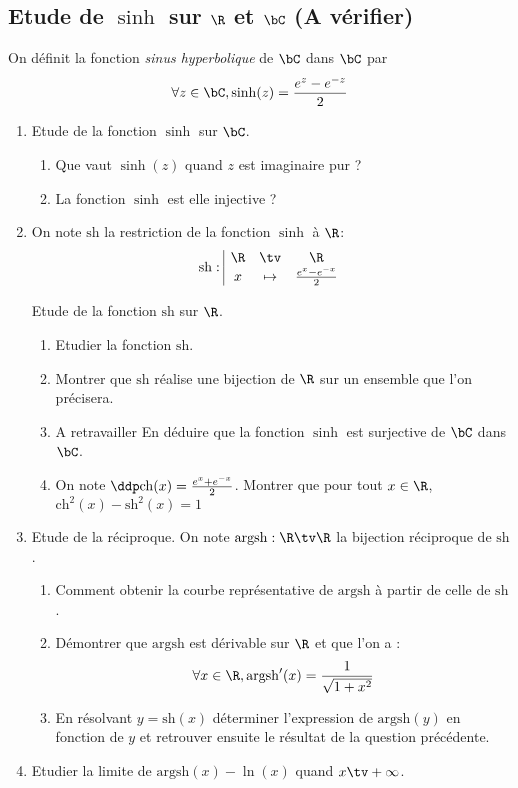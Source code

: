 \subsection{Etude de $\sinh$ sur $\R$ et $\bC$ (A vérifier)} 


\begin{exercice}
On définit la fonction \emph{sinus hyperbolique} de  $\bC$ dans $\bC$ par  
$$\forall z\in \bC, \sinh(z) =\frac{e^z -e^{-z}}{2}$$


\begin{enumerate}
\item Etude de la fonction $\sinh$ sur $\bC$.
\begin{enumerate}
\item Que vaut $\sinh(z)$ quand $z$ est imaginaire pur ? 
\item La fonction $\sinh$ est elle injective ? 
\end{enumerate}

\item  On note $\mathrm{sh}$ la restriction de la fonction $\sinh$ à $\R$:
$$\mathrm{sh} :  \begin{array}{|ccc}
\R &\tv& \R\\
x &\mapsto & \frac{e^x -e^{-x}}{2}
\end{array}$$ 

Etude de la fonction $\mathrm{sh}$ sur $\R$. 
\begin{enumerate}
\item Etudier la fonction $\mathrm{sh}$. 
\item Montrer que $\mathrm{sh}$ réalise une bijection de $\R$ sur un ensemble que l'on précisera.
\item \warning A retravailler \warning En déduire que la fonction $\sinh$ est surjective  de $\bC$ dans $\bC$.  
\item On note $\ddp \mathrm{ch}(x)  =\frac{e^x +e^{-x}}{2}$. Montrer que pour tout $x\in \R$, $\mathrm{ch}^2(x)-\mathrm{sh}^2(x)=1$
\end{enumerate}
\item Etude de la réciproque. 
On note $\mathrm{argsh} : \R \tv \R$ la bijection réciproque de $\mathrm{sh}$. 
\begin{enumerate}
\item  Comment  obtenir la courbe représentative de $\mathrm{argsh} $ à partir de celle de $\mathrm{sh}$. 

\item Démontrer que $\mathrm{argsh} $ est dérivable sur $\R$ et que l'on a :
$$\forall x\in \R, \mathrm{argsh}'(x) = \frac{1}{\sqrt{1+x^2}}$$

\item En résolvant $y=\mathrm{sh}(x)$ déterminer l'expression de $\mathrm{argsh}(y)$ en fonction de $y$ et retrouver ensuite  le résultat de la question précédente. 
\end{enumerate}
\item Etudier la limite de $\mathrm{argsh}(x) - \ln(x)$ quand $x \tv +\infty$. 
\end{enumerate}
\end{exercice}

